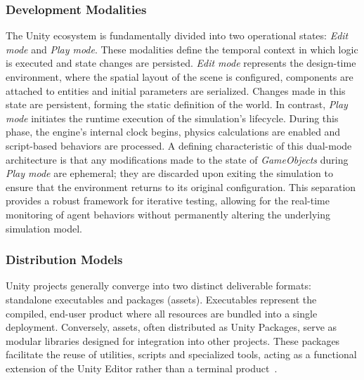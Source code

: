 \subsubsection{Development Modalities}
The Unity ecosystem is fundamentally divided into two operational states: \emph{Edit mode} and \emph{Play mode}. These modalities define the temporal context in which logic is executed and state changes are persisted. \emph{Edit mode} represents the design-time environment, where the spatial layout of the scene is configured, components are attached to entities and initial parameters are serialized. Changes made in this state are persistent, forming the static definition of the world. In contrast, \textit{Play mode} initiates the runtime execution of the simulation's lifecycle. During this phase, the engine's internal clock begins, physics calculations are enabled and script-based behaviors are processed. A defining characteristic of this dual-mode architecture is that any modifications made to the state of \emph{GameObjects} during \emph{Play mode} are ephemeral; they are discarded upon exiting the simulation to ensure that the environment returns to its original configuration. This separation provides a robust framework for iterative testing, allowing for the real-time monitoring of agent behaviors without permanently altering the underlying simulation model.

\subsubsection{Distribution Models}
Unity projects generally converge into two distinct deliverable formats: standalone executables and packages (assets). Executables represent the compiled, end-user product where all resources are bundled into a single deployment. Conversely, assets, often distributed as Unity Packages, serve as modular libraries designed for integration into other projects. These packages facilitate the reuse of utilities, scripts and specialized tools, acting as a functional extension of the Unity Editor rather than a terminal product~\cite{unity_manual_package_types_2026}.
